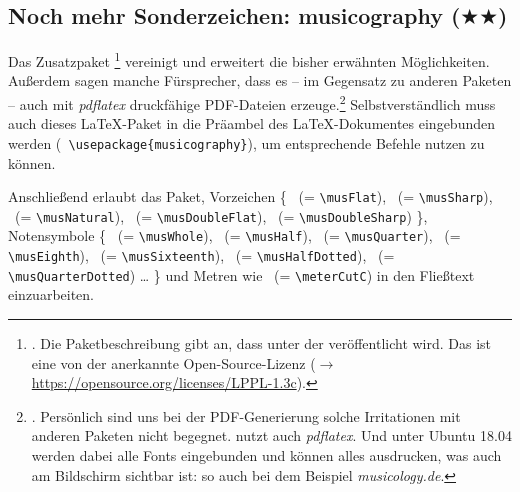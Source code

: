 %
%
%



\subsection{Noch mehr Sonderzeichen: musicography ($\bigstar\bigstar$)}

Das Zusatzpaket \footnote{\cite[vgl.][\nopage
wp]{CtanMusicography2018a}. Die Paketbeschreibung gibt an, dass
 unter der  veröffentlicht
wird. Das ist eine von der  anerkannte Open-Source-Lizenz
($\rightarrow$ \href{https://opensource.org/licenses/LPPL-1.3c}
{https://opensource.org/licenses/LPPL-1.3c}).} vereinigt und erweitert die
bisher erwähnten Möglichkeiten. Außerdem sagen manche Fürsprecher, dass es -- im
Gegensatz zu anderen Paketen -- auch mit \textit{pdflatex} druckfähige
PDF-Dateien erzeuge.\footnote{\cite[Vgl. dazu etwa][1]{Cashner2018a}. Persönlich
sind uns bei der PDF-Generierung solche Irritationen mit anderen Paketen nicht
begegnet.  nutzt auch \textit{pdflatex}. Und unter Ubuntu 18.04
werden dabei alle Fonts eingebunden und können alles ausdrucken, was auch am
Bildschirm sichtbar ist: so auch bei dem Beispiel \textit{musicology.de}.}
Selbstverständlich muss auch dieses \LaTeX-Paket in die Präambel des
\LaTeX-Dokumentes eingebunden werden (\texttt{\small
\textbackslash{usepackage\{musicography\}}}), um entsprechende Befehle nutzen zu
können.

Anschließend erlaubt das Paket, Vorzeichen \{
\musFlat \ (= \texttt{\small \textbackslash{musFlat}}),
\musSharp \ (= \texttt{\small \textbackslash{musSharp}}),
\musNatural \ (= \texttt{\small \textbackslash{musNatural}}),
\musDoubleFlat \ (= \texttt{\small \textbackslash{musDoubleFlat}}),
\musDoubleSharp \ (= \texttt{\small \textbackslash{musDoubleSharp}})
\}, Notensymbole \{
\musWhole \ (= \texttt{\small \textbackslash{musWhole}}),
\musHalf \ (= \texttt{\small \textbackslash{musHalf}}),
\musQuarter \ (= \texttt{\small \textbackslash{musQuarter}}),
\musEighth \ (= \texttt{\small \textbackslash{musEighth}}),
\musSixteenth \ (= \texttt{\small \textbackslash{musSixteenth}}),
\musHalfDotted \ (= \texttt{\small \textbackslash{musHalfDotted}}),
\musQuarterDotted \ (= \texttt{\small \textbackslash{musQuarterDotted}})
\ldots
\}
und Metren wie \meterCutC \ (= \texttt{\small \textbackslash{meterCutC}})
in den Fließtext einzuarbeiten.

